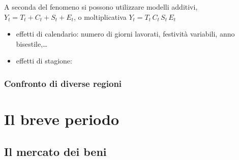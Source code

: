 \documentclass[letterpaper,10pt,italian]{jupyterBook}
\begin{document}
\sphinxAtStartPar
A seconda del fenomeno si possono utilizzare modelli additivi, \(Y_t = T_t + C_t + S_t + E_t\), o moltiplicativa \(Y_t = T_t \, C_t \, S_t \, E_t\)

\sphinxAtStartPar
{}
\begin{itemize}
\item {} 
\sphinxAtStartPar
effetti di calendario: numero di giorni lavorati, festività variabili, anno bisestile,…

\item {} 
\sphinxAtStartPar
effetti di stagione:

\end{itemize}


\subsubsection{Confronto di diverse regioni}
\label{\detokenize{ch/macro:confronto-di-diverse-regioni}}\label{\detokenize{ch/macro:economics-hs-macro-intro-comparisons-space}}

\section{Il breve periodo}
\label{\detokenize{ch/macro:il-breve-periodo}}\label{\detokenize{ch/macro:economics-hs-macro-short-run}}

\subsection{Il mercato dei beni}
\label{\detokenize{ch/macro:il-mercato-dei-beni}}\label{\detokenize{ch/macro:economics-hs-macro-short-run-goods-market}}
\end{document}
